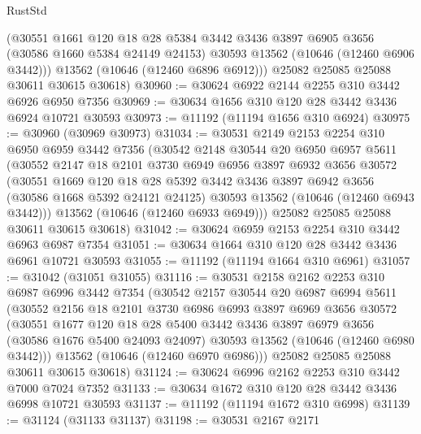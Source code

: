 \begin{lexlean}{RustStd}
\begin{coremodule}
        (@30551
          @1661
          @120
          @18
          @28
          @5384
          @3442
          @3436
          @3897
          @6905
          @3656
          (@30586 @1660 @5384 @24149 @24153)
          @30593
          @13562
          (@10646 (@12460 @6906 @3442)))
        @13562
        (@10646 (@12460 @6896 @6912)))
      @25082
      @25085
      @25088
      @30611
      @30615
      @30618)
@30960 := @30624 @6922 @2144 @2255 @310 @3442 @6926 @6950 @7356
@30969 := @30634 @1656 @310 @120 @28 @3442 @3436 @6924 @10721 @30593
@30973 := @11192 (@11194 @1656 @310 @6924)
@30975 := @30960 (@30969 @30973)
@31034 := @30531
    @2149
    @2153
    @2254
    @310
    @6950
    @6959
    @3442
    @7356
    (@30542
      @2148
      @30544
      @20
      @6950
      @6957
      @5611
      (@30552
        @2147
        @18
        @2101
        @3730
        @6949
        @6956
        @3897
        @6932
        @3656
        @30572
        (@30551
          @1669
          @120
          @18
          @28
          @5392
          @3442
          @3436
          @3897
          @6942
          @3656
          (@30586 @1668 @5392 @24121 @24125)
          @30593
          @13562
          (@10646 (@12460 @6943 @3442)))
        @13562
        (@10646 (@12460 @6933 @6949)))
      @25082
      @25085
      @25088
      @30611
      @30615
      @30618)
@31042 := @30624 @6959 @2153 @2254 @310 @3442 @6963 @6987 @7354
@31051 := @30634 @1664 @310 @120 @28 @3442 @3436 @6961 @10721 @30593
@31055 := @11192 (@11194 @1664 @310 @6961)
@31057 := @31042 (@31051 @31055)
@31116 := @30531
    @2158
    @2162
    @2253
    @310
    @6987
    @6996
    @3442
    @7354
    (@30542
      @2157
      @30544
      @20
      @6987
      @6994
      @5611
      (@30552
        @2156
        @18
        @2101
        @3730
        @6986
        @6993
        @3897
        @6969
        @3656
        @30572
        (@30551
          @1677
          @120
          @18
          @28
          @5400
          @3442
          @3436
          @3897
          @6979
          @3656
          (@30586 @1676 @5400 @24093 @24097)
          @30593
          @13562
          (@10646 (@12460 @6980 @3442)))
        @13562
        (@10646 (@12460 @6970 @6986)))
      @25082
      @25085
      @25088
      @30611
      @30615
      @30618)
@31124 := @30624 @6996 @2162 @2253 @310 @3442 @7000 @7024 @7352
@31133 := @30634 @1672 @310 @120 @28 @3442 @3436 @6998 @10721 @30593
@31137 := @11192 (@11194 @1672 @310 @6998)
@31139 := @31124 (@31133 @31137)
@31198 := @30531
    @2167
    @2171

\end{coremodule}
\end{lexlean}
